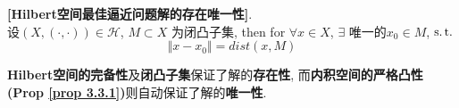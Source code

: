 	\begin{thm}\label{thm 3.3.1}
		\textbf{[Hilbert空间最佳逼近问题解的存在唯一性]}. \\
		设$(X , (\cdot , \cdot)) \in \mathcal{H}$, $M \subset X$ 为闭凸子集, then for $\forall x \in X$, $\exists$ 唯一的$x_0 \in M$, $\operatorname{s.t.}$
		\[ \Vert x - x_0 \Vert = dist(x , M) \]
		
		\vspace{2em}
		
		\begin{rmk}
			\textbf{Hilbert空间的完备性}及\textbf{闭凸子集}保证了解的\textbf{存在性}, 而\textbf{内积空间的严格凸性 (Prop \ref{prop 3.3.1})}则自动保证了解的\textbf{唯一性}.
		\end{rmk}
		
		\vspace{6em}
		

\end{thm}
